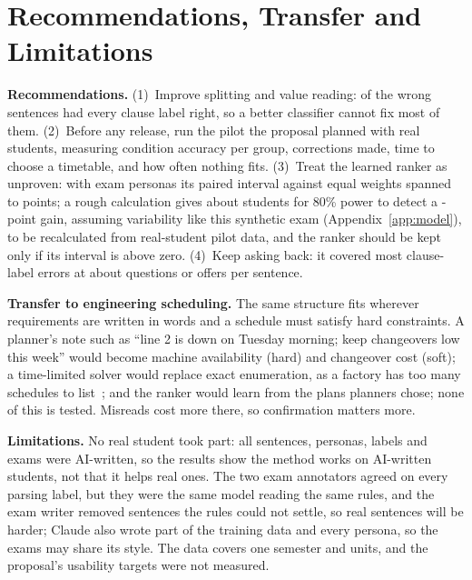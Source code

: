 \section{Recommendations, Transfer and Limitations}\label{sec:recs}

\textbf{Recommendations.} (1)~Improve splitting and value reading: \plWrongRuleS{} of the \plWrongS{} wrong sentences had every clause label right, so a better classifier cannot fix most of them. (2)~Before any release, run the pilot the proposal planned with real students, measuring condition accuracy per group, corrections made, time to choose a timetable, and how often nothing fits. (3)~Treat the learned ranker as unproven: with \sRankExamPersonas{} exam personas its paired interval against equal weights spanned \rDiffEqLo{} to \rDiffEqHi{} points; a rough calculation gives about \rPilotStudents{} students for 80\% power to detect a \rDiffEq-point gain, assuming variability like this synthetic exam (Appendix~\ref{app:model}), to be recalculated from real-student pilot data, and the ranker should be kept only if its interval is above zero. (4)~Keep asking back: it covered most clause-label errors at about \cPerSentence{} questions or offers per sentence.

\textbf{Transfer to engineering scheduling.} The same structure fits wherever requirements are written in words and a schedule must satisfy hard constraints. A planner's note such as ``line 2 is down on Tuesday morning; keep changeovers low this week'' would become machine availability (hard) and changeover cost (soft); a time-limited solver would replace exact enumeration, as a factory has too many schedules to list~\cite{pinedo2022}; and the ranker would learn from the plans planners chose; none of this is tested. Misreads cost more there, so confirmation matters more.

\textbf{Limitations.}\label{sec:limits} No real student took part: all sentences, personas, labels and exams were AI-written, so the results show the method works on AI-written students, not that it helps real ones. The two exam annotators agreed on every parsing label, but they were the same model reading the same rules, and the exam writer removed \sExamDropped{} sentences the rules could not settle, so real sentences will be harder; Claude also wrote part of the training data and every persona, so the exams may share its style. The data covers one semester and \dUnits{} units, and the proposal's usability targets were not measured.
